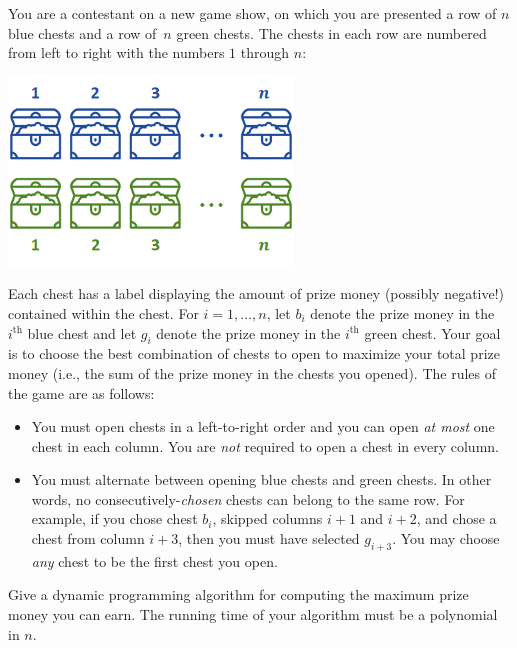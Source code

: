    You are a contestant on a new game show, on which you are presented a row
    of $n$ blue chests and a row of~$n$ green chests. The chests in each row are
    numbered from left to right with the numbers $1$ through $n$:
    
    \begin{center}
        \vspace{-1.2em}
        \includegraphics[height=5cm]{chests.png}
        \vspace{-1.2em}
    \end{center}
    
    Each chest has a label
    displaying the amount of prize money (possibly negative!) contained within the chest. For
    $i = 1, \ldots, n$, let $b_i$ denote the prize money in the $i^{\text{th}}$
    blue chest and let $g_i$ denote the prize money in the $i^{\text{th}}$
    green chest. Your goal is to choose the best combination of chests to open
    to maximize your total prize money (i.e., the sum of the prize money in the
    chests you opened). The rules of the game are as follows:
    \begin{itemize}
        \item You must open chests in a left-to-right order and you can open
        {\em at most} one chest in each column. You are
        {\em not} required to open a chest in every column.
        
        \item You must alternate between opening blue chests and green chests.
        In other words, 
        no consecutively-{\em chosen} chests can belong to the same row.
        For example, if you chose chest $b_i$, skipped columns $i+1$ and $i+2$, and chose a chest from column $i+3$, then you must have selected $g_{i+3}$. 
        You may choose {\em any} chest to be the first chest you open.
    \end{itemize}
    Give a dynamic programming algorithm for computing the maximum prize money
    you can earn. The running time of your algorithm must be a polynomial in $n$.
    
